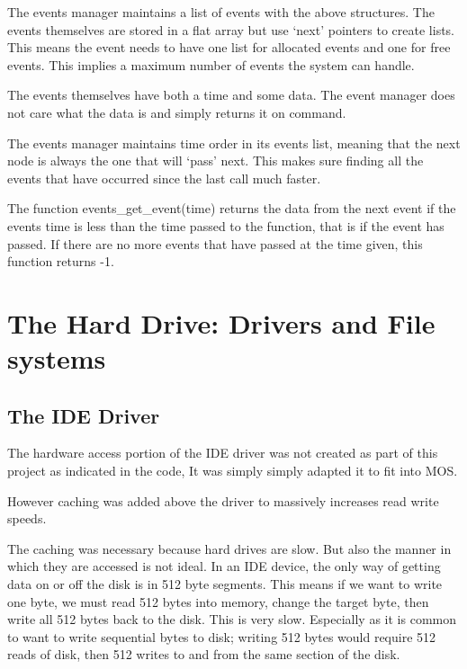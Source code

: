 \documentclass[a4paper]{report}
\begin{document}
The events manager maintains a list of events with the above structures. The events themselves are stored in a flat array but use `next' pointers to create lists. This means the event needs to have one list for allocated events and one for free events. This implies a maximum number of events the system can handle.

The events themselves have both a time and some data. The event manager does not care what the data is and simply returns it on command.

The events manager maintains time order in its events list, meaning that the next node is always the one that will `pass' next. This makes sure finding all the events that have occurred since the last call much faster.

The function events\_get\_event(time) returns the data from the next event if the events time is less than the time passed to the function, that is if the event has passed. If there are no more events that have passed at the time given, this function returns -1.










\clearpage
\section{The Hard Drive: Drivers and File systems}

\subsection{The IDE Driver}

The hardware access portion of the IDE driver was not created as part of this project as indicated in the code, It was simply simply adapted it to fit into MOS.

However caching was added above the driver to massively increases read write speeds.

The caching was necessary because hard drives are slow. But also the manner in which they are accessed is not ideal. In an IDE device, the only way of getting data on or off the disk is in 512 byte segments. This means if we want to write one byte, we must read 512 bytes into memory, change the target byte, then write all 512 bytes back to the disk. This is very slow. Especially as it is common to want to write sequential bytes to disk; writing 512 bytes would require 512 reads of disk, then 512 writes to and from the same section of the disk.
\end{document}
